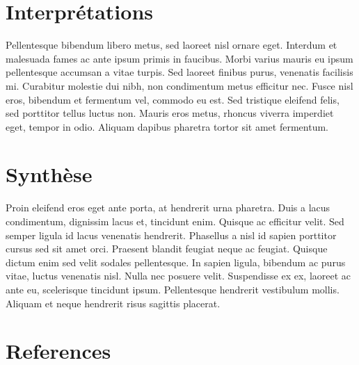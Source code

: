 \documentclass[
  12pt,
  oneside]{article}
\begin{document}
\hypertarget{interpruxe9tations}{%
\section{Interprétations}\label{interpruxe9tations}}

Pellentesque bibendum libero metus, sed laoreet nisl ornare eget.
Interdum et malesuada fames ac ante ipsum primis in faucibus. Morbi
varius mauris eu ipsum pellentesque accumsan a vitae turpis. Sed laoreet
finibus purus, venenatis facilisis mi. Curabitur molestie dui nibh, non
condimentum metus efficitur nec. Fusce nisl eros, bibendum et fermentum
vel, commodo eu est. Sed tristique eleifend felis, sed porttitor tellus
luctus non. Mauris eros metus, rhoncus viverra imperdiet eget, tempor in
odio. Aliquam dapibus pharetra tortor sit amet fermentum.

\hypertarget{synthuxe8se}{%
\section{Synthèse}\label{synthuxe8se}}

Proin eleifend eros eget ante porta, at hendrerit urna pharetra. Duis a
lacus condimentum, dignissim lacus et, tincidunt enim. Quisque ac
efficitur velit. Sed semper ligula id lacus venenatis hendrerit.
Phasellus a nisl id sapien porttitor cursus sed sit amet orci. Praesent
blandit feugiat neque ac feugiat. Quisque dictum enim sed velit sodales
pellentesque. In sapien ligula, bibendum ac purus vitae, luctus
venenatis nisl. Nulla nec posuere velit. Suspendisse ex ex, laoreet ac
ante eu, scelerisque tincidunt ipsum. Pellentesque hendrerit vestibulum
mollis. Aliquam et neque hendrerit risus sagittis placerat.

\hypertarget{references}{%
\section{References}\label{references}}
\end{document}
